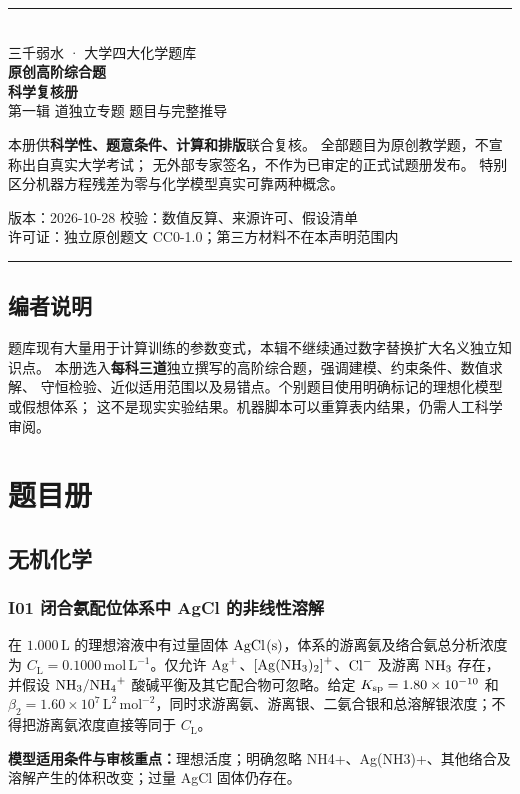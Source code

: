 \documentclass[UTF8,openany,11pt,a4paper]{ctexbook}
\newcommand{\sciencewarn}[1]{\begin{reviewnote}\textbf{\textcolor{warn}{模型适用条件与审核重点：}}#1\end{reviewnote}}
\begin{document}
\begin{titlepage}
\vspace*{22mm}
{\color{accent}\rule{\linewidth}{2.3pt}}\\[12mm]
{\Large 三千弱水 · 大学四大化学题库}\\[12mm]
{\Huge\bfseries 原创高阶综合题}\\[4mm]
{\Huge\bfseries 科学复核册}\\[12mm]
{\large 第一辑  道独立专题 \quad 题目与完整推导}\\[16mm]
\begin{reviewnote}
本册供\textbf{科学性、题意条件、计算和排版}联合复核。
全部题目为原创教学题，不宣称出自真实大学考试；
无外部专家签名，不作为已审定的正式试题册发布。
特别区分机器方程残差为零与化学模型真实可靠两种概念。
\end{reviewnote}
\vfill
{\small 版本：2026-10-28 \quad 校验：数值反算、来源许可、假设清单}\\[6mm]
{\small 许可证：独立原创题文 CC0-1.0；第三方材料不在本声明范围内}
{\color{accent}\rule{\linewidth}{1.1pt}}
\end{titlepage}
\frontmatter
\tableofcontents
\mainmatter
\chapter*{编者说明}
题库现有大量用于计算训练的参数变式，本辑不继续通过数字替换扩大名义独立知识点。
本册选入\textbf{每科三道}独立撰写的高阶综合题，强调建模、约束条件、数值求解、
守恒检验、近似适用范围以及易错点。个别题目使用明确标记的理想化模型或假想体系；
这不是现实实验结果。机器脚本可以重算表内结果，仍需人工科学审阅。
\part{题目册}
\chapter{无机化学}
\section{I01 \quad 闭合氨配位体系中 AgCl 的非线性溶解}
在 \(1.000\,\mathrm L\) 的理想溶液中有过量固体 \(\ce{AgCl(s)}\)，体系的游离氨及络合氨总分析浓度为 \(C_{\mathrm L}=0.1000\,\mathrm{mol\,L^{-1}}\)。仅允许 \(\ce{Ag+}\)、\(\ce{[Ag(NH3)2]+}\)、\(\ce{Cl-}\) 及游离 \(\ce{NH3}\) 存在，并假设 \(\ce{NH3}/\ce{NH4+}\) 酸碱平衡及其它配合物可忽略。给定 \(K_{\rm sp}=1.80\times10^{-10}\) 和 \(\beta_2=1.60\times10^7\,\mathrm{L^2\,mol^{-2}}\)，同时求游离氨、游离银、二氨合银和总溶解银浓度；不得把游离氨浓度直接等同于 \(C_{\mathrm L}\)。
\sciencewarn{理想活度；明确忽略 NH4+、Ag(NH3)+、其他络合及溶解产生的体积改变；过量 AgCl 固体仍存在。}
\end{document}
